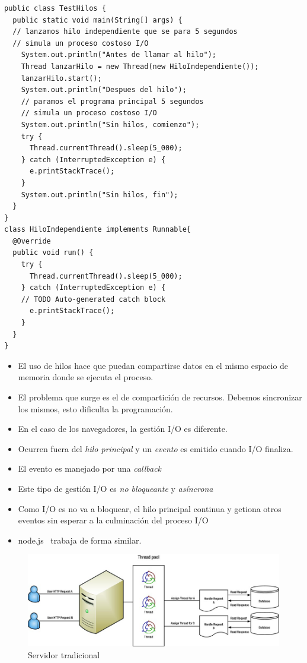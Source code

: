 \documentclass[4paper]{article}
\newcommand{\N}{node.js}
\begin{document}
\begin{lstlisting}
public class TestHilos {
  public static void main(String[] args) {
  // lanzamos hilo independiente que se para 5 segundos
  // simula un proceso costoso I/O
    System.out.println("Antes de llamar al hilo");
    Thread lanzarHilo = new Thread(new HiloIndependiente());
    lanzarHilo.start();
    System.out.println("Despues del hilo");
    // paramos el programa principal 5 segundos
    // simula un proceso costoso I/O
    System.out.println("Sin hilos, comienzo");
    try {
      Thread.currentThread().sleep(5_000); 
    } catch (InterruptedException e) {
      e.printStackTrace();
    }
    System.out.println("Sin hilos, fin");
  }
}
class HiloIndependiente implements Runnable{
  @Override
  public void run() {
    try {
      Thread.currentThread().sleep(5_000);
    } catch (InterruptedException e) {
    // TODO Auto-generated catch block
      e.printStackTrace();
    }
  }
}
\end{lstlisting}

\begin{itemize}
\item El uso de hilos hace que puedan compartirse datos en el mismo espacio de memoria donde se ejecuta el proceso.
\item El problema que surge es el de compartición de recursos. Debemos sincronizar los mismos, esto dificulta la programación.
\item En el caso de los navegadores, la gestión I/O es diferente.
\item Ocurren fuera del \emph{hilo principal} y un \emph{evento} es emitido cuando I/O finaliza.
\item El evento es manejado por una \emph{callback} 
\item Este tipo de gestión I/O es \emph{no bloqueante} y \emph{asíncrona}
\item Como I/O es no va a bloquear, el hilo principal continua y getiona otros eventos sin esperar a la culminación del proceso I/O
\item \N ~ trabaja de forma similar.
\end{itemize}


\begin{figure}[H]
\includegraphics[scale=1]{../imagenes/server.jpg}
\caption{Servidor tradicional}
\end{figure}
\end{document}
